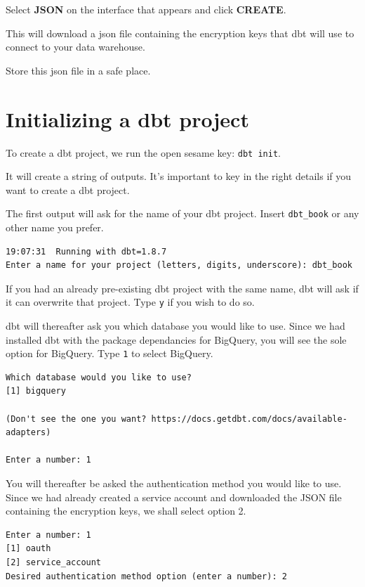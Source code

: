 \documentclass[
]{book}
\begin{document}
Select \textbf{JSON} on the interface that appears and click \textbf{CREATE}.

This will download a json file containing the encryption keys that dbt will use to connect to your data warehouse.

Store this json file in a safe place.

\hypertarget{initializing-a-dbt-project}{%
\section{Initializing a dbt project}\label{initializing-a-dbt-project}}

To create a dbt project, we run the open sesame key: \texttt{dbt\ init}.

It will create a string of outputs. It's important to key in the right details if you want to create a dbt project.

The first output will ask for the name of your dbt project. Insert \texttt{dbt\_book} or any other name you prefer.

\begin{verbatim}
19:07:31  Running with dbt=1.8.7
Enter a name for your project (letters, digits, underscore): dbt_book
\end{verbatim}

If you had an already pre-existing dbt project with the same name, dbt will ask if it can overwrite that project. Type \texttt{y} if you wish to do so.

dbt will thereafter ask you which database you would like to use. Since we had installed dbt with the package dependancies for BigQuery, you will see the sole option for BigQuery. Type \texttt{1} to select BigQuery.

\begin{verbatim}
Which database would you like to use?
[1] bigquery

(Don't see the one you want? https://docs.getdbt.com/docs/available-adapters)

Enter a number: 1
\end{verbatim}

You will thereafter be asked the authentication method you would like to use. Since we had already created a service account and downloaded the JSON file containing the encryption keys, we shall select option 2.

\begin{verbatim}
Enter a number: 1
[1] oauth
[2] service_account
Desired authentication method option (enter a number): 2
\end{verbatim}
\end{document}
